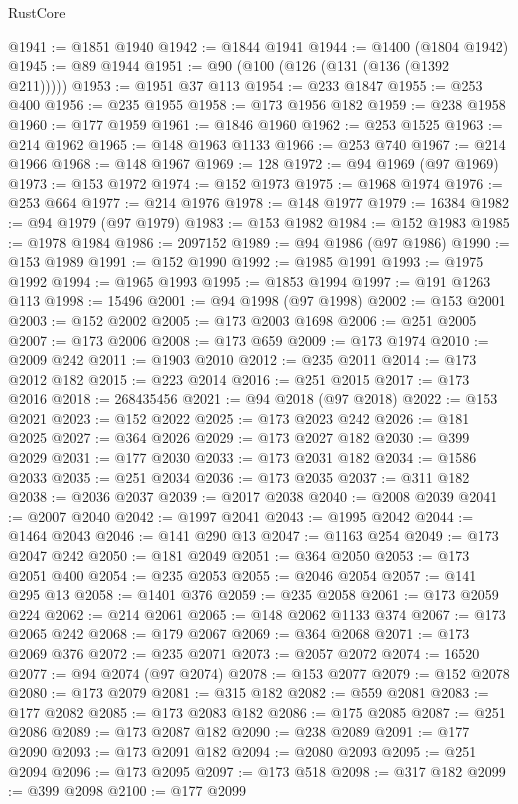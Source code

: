\begin{lexlean}{RustCore}
\begin{coremodule}
@1941 := @1851 @1940
@1942 := @1844 @1941
@1944 := @1400 (@1804 @1942)
@1945 := @89 @1944
@1951 := @90 (@100 (@126 (@131 (@136 (@1392 @211)))))
@1953 := @1951 @37 @113
@1954 := @233 @1847
@1955 := @253 @400
@1956 := @235 @1955
@1958 := @173 @1956 @182
@1959 := @238 @1958
@1960 := @177 @1959
@1961 := @1846 @1960
@1962 := @253 @1525
@1963 := @214 @1962
@1965 := @148 @1963 @1133
@1966 := @253 @740
@1967 := @214 @1966
@1968 := @148 @1967
@1969 := 128
@1972 := @94 @1969 (@97 @1969)
@1973 := @153 @1972
@1974 := @152 @1973
@1975 := @1968 @1974
@1976 := @253 @664
@1977 := @214 @1976
@1978 := @148 @1977
@1979 := 16384
@1982 := @94 @1979 (@97 @1979)
@1983 := @153 @1982
@1984 := @152 @1983
@1985 := @1978 @1984
@1986 := 2097152
@1989 := @94 @1986 (@97 @1986)
@1990 := @153 @1989
@1991 := @152 @1990
@1992 := @1985 @1991
@1993 := @1975 @1992
@1994 := @1965 @1993
@1995 := @1853 @1994
@1997 := @191 @1263 @113
@1998 := 15496
@2001 := @94 @1998 (@97 @1998)
@2002 := @153 @2001
@2003 := @152 @2002
@2005 := @173 @2003 @1698
@2006 := @251 @2005
@2007 := @173 @2006
@2008 := @173 @659
@2009 := @173 @1974
@2010 := @2009 @242
@2011 := @1903 @2010
@2012 := @235 @2011
@2014 := @173 @2012 @182
@2015 := @223 @2014
@2016 := @251 @2015
@2017 := @173 @2016
@2018 := 268435456
@2021 := @94 @2018 (@97 @2018)
@2022 := @153 @2021
@2023 := @152 @2022
@2025 := @173 @2023 @242
@2026 := @181 @2025
@2027 := @364 @2026
@2029 := @173 @2027 @182
@2030 := @399 @2029
@2031 := @177 @2030
@2033 := @173 @2031 @182
@2034 := @1586 @2033
@2035 := @251 @2034
@2036 := @173 @2035
@2037 := @311 @182
@2038 := @2036 @2037
@2039 := @2017 @2038
@2040 := @2008 @2039
@2041 := @2007 @2040
@2042 := @1997 @2041
@2043 := @1995 @2042
@2044 := @1464 @2043
@2046 := @141 @290 @13
@2047 := @1163 @254
@2049 := @173 @2047 @242
@2050 := @181 @2049
@2051 := @364 @2050
@2053 := @173 @2051 @400
@2054 := @235 @2053
@2055 := @2046 @2054
@2057 := @141 @295 @13
@2058 := @1401 @376
@2059 := @235 @2058
@2061 := @173 @2059 @224
@2062 := @214 @2061
@2065 := @148 @2062 @1133 @374
@2067 := @173 @2065 @242
@2068 := @179 @2067
@2069 := @364 @2068
@2071 := @173 @2069 @376
@2072 := @235 @2071
@2073 := @2057 @2072
@2074 := 16520
@2077 := @94 @2074 (@97 @2074)
@2078 := @153 @2077
@2079 := @152 @2078
@2080 := @173 @2079
@2081 := @315 @182
@2082 := @559 @2081
@2083 := @177 @2082
@2085 := @173 @2083 @182
@2086 := @175 @2085
@2087 := @251 @2086
@2089 := @173 @2087 @182
@2090 := @238 @2089
@2091 := @177 @2090
@2093 := @173 @2091 @182
@2094 := @2080 @2093
@2095 := @251 @2094
@2096 := @173 @2095
@2097 := @173 @518
@2098 := @317 @182
@2099 := @399 @2098
@2100 := @177 @2099

\end{coremodule}
\end{lexlean}
